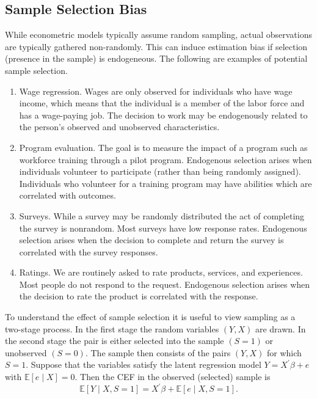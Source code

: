 \documentclass[10pt]{article}
\begin{document}
\subsection{Sample Selection Bias}
While econometric models typically assume random sampling, actual observations are typically gathered non-randomly. This can induce estimation bias if selection (presence in the sample) is endogeneous. The following are examples of potential sample selection.

\begin{enumerate}
  \item Wage regression. Wages are only observed for individuals who have wage income, which means that the individual is a member of the labor force and has a wage-paying job. The decision to work may be endogenously related to the person's observed and unobserved characteristics.

  \item Program evaluation. The goal is to measure the impact of a program such as workforce training through a pilot program. Endogenous selection arises when individuals volunteer to participate (rather than being randomly assigned). Individuals who volunteer for a training program may have abilities which are correlated with outcomes.

  \item Surveys. While a survey may be randomly distributed the act of completing the survey is nonrandom. Most surveys have low response rates. Endogenous selection arises when the decision to complete and return the survey is correlated with the survey responses.

  \item Ratings. We are routinely asked to rate products, services, and experiences. Most people do not respond to the request. Endogenous selection arises when the decision to rate the product is correlated with the response.

\end{enumerate}
To understand the effect of sample selection it is useful to view sampling as a two-stage process. In the first stage the random variables $(Y, X)$ are drawn. In the second stage the pair is either selected into the sample $(S=1)$ or unobserved $(S=0)$. The sample then consists of the pairs $(Y, X)$ for which $S=1$. Suppose that the variables satisfy the latent regression model $Y=X^{\prime} \beta+e$ with $\mathbb{E}[e \mid X]=0$. Then the CEF in the observed (selected) sample is
$$
\mathbb{E}[Y \mid X, S=1]=X^{\prime} \beta+\mathbb{E}[e \mid X, S=1] .
$$
\end{document}
